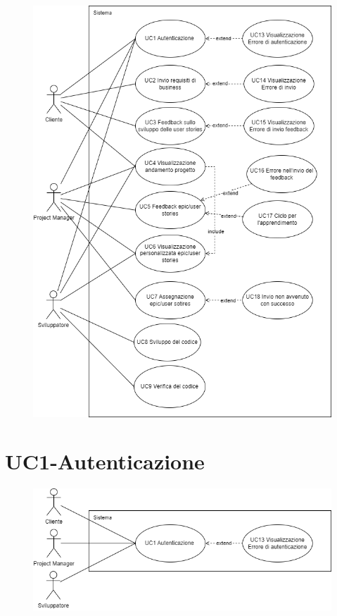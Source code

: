 \documentclass{article}
\begin{document}
\newpage
\begin{figure}[h]
    \centering
    \includegraphics[height = 0.75\textheight]{./imgUML/UML.png}
    \label{fig:immagine}
\end{figure}
\newpage
\section{UC1-Autenticazione}
    \begin{figure}[h]
      \centering
      \includegraphics{./imgUML/UC1.png}
      \label{fig:immagine}
    \end{figure} 
    
\end{document}
